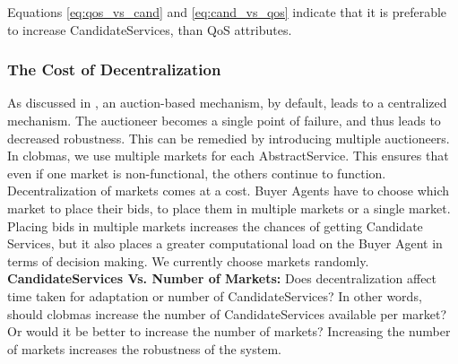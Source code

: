 \documentclass[10pt,journal,compsoc]{IEEEtran}
\begin{document}
Equations \ref{eq:qos_vs_cand} and \ref{eq:cand_vs_qos} indicate that it is preferable to increase CandidateServices, than QoS attributes. 


\subsubsection{The Cost of Decentralization}
As discussed in \cite{Eymann2003Decentralized}, an auction-based mechanism, by default, leads to a centralized mechanism. The auctioneer becomes a single point of failure, and thus leads to decreased robustness. This can be remedied by introducing multiple auctioneers. In clobmas, we use multiple markets for each AbstractService. This ensures that even if one market is non-functional, the others continue to function. Decentralization of markets comes at a cost. Buyer Agents have to choose which market to place their bids, to place them in multiple markets or a single market. Placing bids in multiple markets increases the chances of getting Candidate Services, but it also places a greater computational load on the Buyer Agent in terms of decision making. We currently choose markets randomly.\\
\textbf{CandidateServices Vs. Number of Markets:} Does decentralization affect time taken for adaptation or number of CandidateServices? In other words, should clobmas increase the number of CandidateServices available per market? Or would it be better to increase the number of markets? Increasing the number of markets increases the robustness of the system. 
\end{document}
